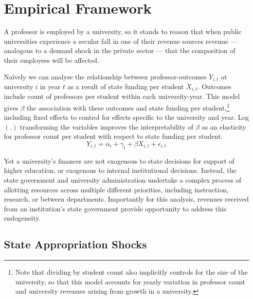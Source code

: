 \section{Empirical Framework}
\label{sec:empirics}

A professor is employed by a university, so it stands to reason that when public universities experience a secular fall in one of their revenue sources revenue --- analogous to a demand shock in the private sector --- that the composition of their employees will be affected.

Na\"ively we can analyse the relationship between professor-outcomes $Y_{i,t}$ at university $i$ in year $t$ as a result of state funding per student $X_{i,t}$.
Outcomes include count of professors per student within each university-year.
This model gives $\beta$ the association with these outcomes and state funding per student,\footnote{
    Note that dividing by student count also implicitly controls for the size of the university, so that this model accounts for yearly variation in professor count and university revenues arising from growth in a university.
}
including fixed effects to control for effects specific to the university and year.
Log$(.)$ transforming the variables improves the interpretability of $\beta$ as an elasticity for professor count per student with respect to state funding per student.
\begin{equation}
    \label{eqn:naivereg}
    Y_{i,t} = \alpha_i + \gamma_t + \beta X_{i,t} + \epsilon_{i,t}
\end{equation}

Yet a university's finances are not exogenous to state decisions for support of higher education, or exogenous to internal institutional decisions.
Instead, the state government and university administration undertake a complex process of allotting resources across multiple different priorities, including instruction, research, or between departments.
Importantly for this analysis, revenues received from an institution's state government provide opportunity to address this endogeneity.


\subsection{State Appropriation Shocks}
\label{sec:approp-shocks}

